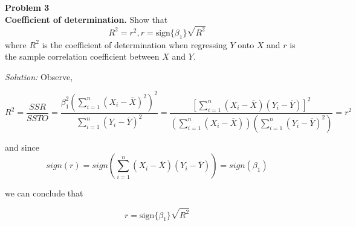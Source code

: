 \documentclass{article}
\newenvironment{problem}[2][Problem]
    { \begin{mdframed}[backgroundcolor=gray!20] \textbf{#1 #2} \\}
    {  \end{mdframed}}
\newenvironment{solution}
    {\textit{Solution:}}
    {}
\begin{document}
\begin{problem}{3}
\textbf{Coefficient of determination.} Show that 
$$R^2 =r^2, r= \text{sign}\{\beta_1\} \sqrt{R^2}$$
where $R^2$ is the coefficient of determination when regressing $Y$ onto $X$ and $r$ is the sample correlation coefficient between $X$ and $Y$.
\end{problem}
\begin{solution}
Observe, 

$$R^2 = \frac{SSR}{SSTO} = \frac{\beta_1^2 \left (\sum_{i = 1}^n (X_i - \overline{X})^2 \right)^2}{\sum_{i = 1}^n (Y_i - \overline{Y})^2} =  \frac{\left [ \sum_{i = 1}^n (X_i - \overline{X}) (Y_i - \overline{Y}) \right]^2}{ \left (\sum_{i = 1}^n (X_i - \overline{X}) \right) \left (\sum_{i = 1}^n (Y_i - \overline{Y})^2 \right) } = r^2$$

and since 
$$sign(r) = sign( \sum_{i = 1}^n (X_i - \overline{X}) (Y_i - \overline{Y})) = sign(\beta_1)$$

we can conclude that

$$r= \text{sign}\{\beta_1\} \sqrt{R^2}$$
\end{solution}
\end{document}
